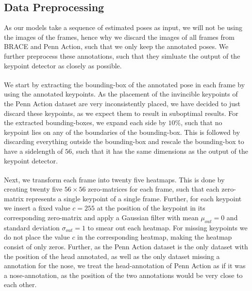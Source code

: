 \documentclass[./main.tex]{subfiles}
\begin{document}
\subsection{Data Preprocessing}
\label{sec:pretrain_data_preprocessing}
As our models take a sequence of estimated poses as input, we will not be using the images of the frames, hence why we discard the images of all frames from BRACE and Penn Action, such that we only keep the annotated poses. We further preprocess these annotations, such that they simluate the output of the keypoint detector as closely as possible.
\\
\\
We start by extracting the bounding-box of the annotated pose in each frame by using the annotated keypoints. As the placement of the invincible keypoints of the Penn Action dataset are very inconsistently placed, we have decided to just discard these keypoints, as we expect them to result in suboptimal results. For the extracted bounding-boxes, we expand each side by $10\%$, such that no keypoint lies on any of the boundaries of the bounding-box. This is followed by discarding everything outside the bounding-box and rescale the bounding-box to have a sidelength of $56$, such that it has the same dimensions as the output of the keypoint detector.
\\
\\
Next, we transform each frame into twenty five heatmaps. This is done by creating twenty five $56 \times 56$ zero-matrices for each frame, such that each zero-matrix represents a single keypoint of a single frame. Further, for each keypoint we insert a fixed value $c = 255$ at the position of the keypoint in its corresponding zero-matrix and apply a Gaussian filter with mean $\mu_{out} = 0$ and standard deviation $\sigma_{out} = 1$ to smear out each heatmap. For missing keypoints we do not place the value $c$ in the corresponding heatmap, making the heatmap consist of only zeros. Further, as the Penn Action dataset is the only dataset with the position of the head annotated, as well as the only dataset missing a annotation for the nose, we treat the head-annotation of Penn Action as if it was a nose-annotation, as the position of the two annotations would be very close to each other.
\\
\\
\end{document}
